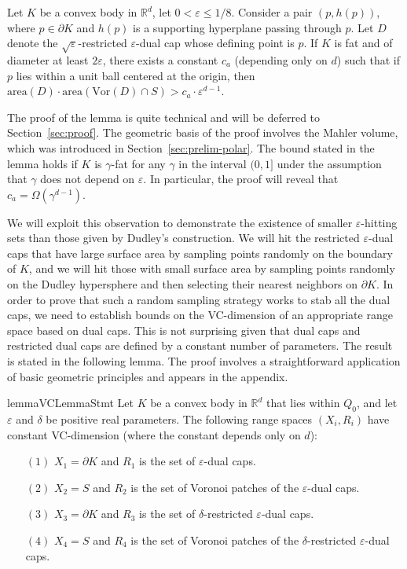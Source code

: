 \documentclass[11pt]{article}   \usepackage[letterpaper,hmargin=2.1cm,vmargin=3cm]{geometry}
\newcommand{\RE}{\mathbb{R}}    \newcommand{\ZZ}{\mathbb{Z}}    \newcommand{\eps}{\varepsilon}  \newcommand{\ST}{\,:\,}         \newcommand{\sq}{\square}
\newcommand{\area}{\mathrm{area}}
\newcommand{\Vor}{\mathrm{Vor}}
\begin{document}
\begin{lemma} \label{lem:dual-basic}
Let $K$ be a convex body in $\RE^d$, let $0 < \eps \le 1/8$. Consider a pair $(p,h(p))$, where $p \in \partial K$ and $h(p)$ is a supporting hyperplane passing through $p$. Let $D$ denote the $\sqrt{\eps}$-restricted $\eps$-dual cap whose defining point is $p$. If $K$ is fat and of diameter at least $2 \eps$, there exists a constant $c_a$ (depending only on $d$) such that if $p$ lies within a unit ball centered at the origin, then $\area(D) \cdot \area(\Vor(D) \cap S) > c_a \cdot \eps^{d-1}$.
\end{lemma}


The proof of the lemma is quite technical and will be deferred to Section~\ref{sec:proof}. The geometric basis of the proof involves the Mahler volume, which was introduced in Section~\ref{sec:prelim-polar}. The bound stated in the lemma holds if $K$ is $\gamma$-fat for any $\gamma$ in the interval $(0,1]$ under the assumption that $\gamma$ does not depend on $\eps$. In particular, the proof will reveal that $c_a = \Omega(\gamma^{d-1})$.

We will exploit this observation to demonstrate the existence of smaller $\eps$-hitting sets than those given by Dudley's construction. We will hit the restricted $\eps$-dual caps that have large surface area by sampling points randomly on the boundary of $K$, and we will hit those with small surface area by sampling points randomly on the Dudley hypersphere and then selecting their nearest neighbors on $\partial K$. In order to prove that such a random sampling strategy works to stab all the dual caps, we need to establish bounds on the VC-dimension of an appropriate range space based on dual caps. This is not surprising given that dual caps and restricted dual caps are defined by a constant number of parameters. The result is stated in the following lemma. The proof involves a straightforward application of basic geometric principles and appears in the appendix.

\begin{restatable}{lemma}{VCLemmaStmt}\label{lem:VC}
Let $K$ be a convex body in $\RE^d$ that lies within $Q_0$, and let $\eps$ and $\delta$ be positive real parameters. The following range spaces $(X_i,R_i)$ have constant VC-dimension (where the constant depends only on $d$):
\begin{enumerate}
	\setlength{\itemsep}{-0.5ex}\setlength{\parsep}{0pt}\item[$(1)$] $X_1 = \partial K$ and $R_1$ is the set of $\eps$-dual caps.
	\item[$(2)$] $X_2 = S$ and $R_2$ is the set of Voronoi patches of the $\eps$-dual caps.
	\item[$(3)$] $X_3 = \partial K$ and $R_3$ is the set of $\delta$-restricted $\eps$-dual caps.
	\item[$(4)$] $X_4 = S$ and $R_4$ is the set of Voronoi patches of the $\delta$-restricted $\eps$-dual caps.
\end{enumerate}
\end{restatable}
\end{document}
